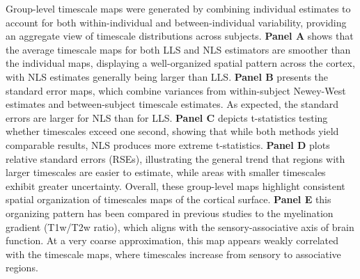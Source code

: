 \documentclass[latex/main.tex]{subfiles}
\begin{document}
Group-level timescale maps were generated by combining individual estimates to account for both within-individual and between-individual variability, providing an aggregate view of timescale distributions across subjects. \textbf{Panel A} shows that the average timescale maps for both LLS and NLS estimators are smoother than the individual maps, displaying a well-organized spatial pattern across the cortex, with NLS estimates generally being larger than LLS. \textbf{Panel B} presents the standard error maps, which combine variances from within-subject Newey-West estimates and between-subject timescale estimates. As expected, the standard errors are larger for NLS than for LLS. \textbf{Panel C} depicts t-statistics testing whether timescales exceed one second, showing that while both methods yield comparable results, NLS produces more extreme t-statistics. \textbf{Panel D} plots relative standard errors (RSEs), illustrating the general trend that regions with larger timescales are easier to estimate, while areas with smaller timescales exhibit greater uncertainty. Overall, these group-level maps highlight consistent spatial organization of timescales maps of the cortical surface. \textbf{Panel E} this organizing pattern has been compared in previous studies to the myelination gradient (T1w/T2w ratio), which aligns with the sensory-associative axis of brain function. At a very coarse approximation, this map appears weakly correlated with the timescale maps, where timescales increase from sensory to associative regions.
\end{document}
